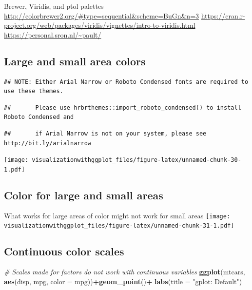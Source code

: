 \documentclass[]{krantz}
\makeatletter
\newenvironment{Shaded}{\begin{snugshade}}{\end{snugshade}}
\newcommand{\CommentTok}[1]{\textcolor[rgb]{0.56,0.35,0.01}{\textit{#1}}}
\newcommand{\DataTypeTok}[1]{\textcolor[rgb]{0.13,0.29,0.53}{#1}}
\newcommand{\KeywordTok}[1]{\textcolor[rgb]{0.13,0.29,0.53}{\textbf{#1}}}
\newcommand{\NormalTok}[1]{#1}
\newcommand{\OperatorTok}[1]{\textcolor[rgb]{0.81,0.36,0.00}{\textbf{#1}}}
\newcommand{\StringTok}[1]{\textcolor[rgb]{0.31,0.60,0.02}{#1}}
\newenvironment{kframe}{%
\medskip{}
\setlength{\fboxsep}{.8em}
 \def\at@end@of@kframe{}%
 \ifinner\ifhmode%
  \def\at@end@of@kframe{\end{minipage}}%
  \begin{minipage}{\columnwidth}%
 \fi\fi%
 \def\FrameCommand##1{\hskip\@totalleftmargin \hskip-\fboxsep
 \colorbox{shadecolor}{##1}\hskip-\fboxsep
     \hskip-\linewidth \hskip-\@totalleftmargin \hskip\columnwidth}%
 \MakeFramed {\advance\hsize-\width
   \@totalleftmargin\z@ \linewidth\hsize
   \@setminipage}}%
 {\par\unskip\endMakeFramed%
 \at@end@of@kframe}
\renewenvironment{Shaded}{\begin{kframe}}{\end{kframe}}
\makeatother
\begin{document}
Brewer, Viridis, and ptol palettes
\url{http://colorbrewer2.org/\#type=sequential\&scheme=BuGn\&n=3}
\url{https://cran.r-project.org/web/packages/viridis/vignettes/intro-to-viridis.html}
\url{https://personal.sron.nl/~pault/}

\hypertarget{large-and-small-area-colors}{%
\subsection{Large and small area colors}\label{large-and-small-area-colors}}

\begin{verbatim}
## NOTE: Either Arial Narrow or Roboto Condensed fonts are required to use these themes.
\end{verbatim}

\begin{verbatim}
##       Please use hrbrthemes::import_roboto_condensed() to install Roboto Condensed and
\end{verbatim}

\begin{verbatim}
##       if Arial Narrow is not on your system, please see http://bit.ly/arialnarrow
\end{verbatim}

\texttt{[image: visualizationwithggplot\_files/figure-latex/unnamed-chunk-30-1.pdf]}

\hypertarget{color-for-large-and-small-areas}{%
\subsection{Color for large and small areas}\label{color-for-large-and-small-areas}}

What works for large areas of color might not work for small areas
\texttt{[image: visualizationwithggplot\_files/figure-latex/unnamed-chunk-31-1.pdf]}

\hypertarget{continuous-color-scales}{%
\subsection{Continuous color scales}\label{continuous-color-scales}}

\begin{Shaded}
\begin{Highlighting}[]
\CommentTok{# Scales made for factors do not work with continuous variables}
\KeywordTok{ggplot}\NormalTok{(mtcars, }\KeywordTok{aes}\NormalTok{(disp,  mpg, }\DataTypeTok{color =}\NormalTok{ mpg))}\OperatorTok{+}\KeywordTok{geom_point}\NormalTok{()}\OperatorTok{+}
\StringTok{  }\KeywordTok{labs}\NormalTok{(}\DataTypeTok{title =} \StringTok{"gplot: Default"}\NormalTok{)}
\end{Highlighting}
\end{Shaded}
\end{document}
